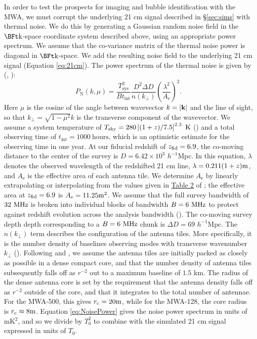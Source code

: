 In order to test the prospects for imaging and bubble identification with
the MWA, we must corrupt the underlying 21 cm signal described in \S \ref{sec:sims}
with thermal noise. We do this by generating a Gaussian random noise field in
the $\k$-space coordinate system described above, using an appropriate power spectrum. We assume that
the co-variance matrix of the thermal noise power is diagonal in $\k$-space. We add
the resulting noise field to the underlying 21 cm signal (Equation \ref{eq:21cm}).
The power spectrum of the thermal noise is given by (\citealt{McQuinn:2005hk}, \citealt{Furlanetto:2006pg}):
\begin{equation}
P_{\text{N}}(k,\mu) =
\frac{T_{\text{sys}}^2}{Bt_{\text{int}}}\frac{D^2\Delta
  D}{n(k_\perp)}\left( \frac{\lambda^2}{A_{\text{e}}}
\right)^{2}. \label{eq:NoisePower}
\end{equation}
Here $\mu$ is the cosine of the angle between wavevector $k = |{\bf
  k}|$ and the line of sight, so that $k_{\perp} = \sqrt{1-\mu^2} k$ is the transverse component of the wavevector. We 
assume a system temperature of $T_{\text{sky}} = 280
\left[(1+z)/7.5\right]^{2.3}\kelvin$ (\citealt{Wyithe:2007if}) and a total
observing time of $t_{\text{int}} = 1000\ \text{hours}$, which is an optimistic
estimate for the observing time in one year. At our fiducial redshift of $z_{\rm fid} = 6.9$, the co-moving
distance to the
center of the survey is $D = 6.42 \times 10^3$ $h^{-1}$Mpc. In this equation, $\lambda$ denotes
the observed wavelength of the redshifted 21 cm line,
$\lambda = 0.211(1+z) \meter$, and $A_{\text{e}}$ is the effective area of
each antenna tile. We determine $A_{\text{e}}$ by linearly extrapolating
or interpolating from the values given in
\href{http://iopscience.iop.org/0004-637X/661/1/1/fulltext/64283.tb2.html}{Table
  2} of \cite{Bowman:2005hj}; the effective area at $z_{\rm fid} = 6.9$ is
$A_{\text{e}}=11.25 \meter^2$. We assume that the full survey bandwidth of
$32 \MHz$ is broken into individual blocks of bandwidth $B = 6 \MHz$ to protect
against redshift evolution across the analysis bandwidth (\citealt{McQuinn:2005hk}). The co-moving survey depth depth corresponding to a $B= 6 \MHz$ chunk is $\Delta D = 69$ $h^{-1}$Mpc.
The $n(k_\perp)$ term describes the configuration of the antenna tiles. More specifically,
it is the number density of baselines observing modes with transverse wavenumber
$k_{\perp}$ (\citealt{McQuinn:2005hk}). Following \cite{Bowman:2005cr} and \cite{McQuinn:2005hk},
we assume the antenna tiles are initially packed as closely as possible in a
dense compact core, and that the number density of antenna tiles subsequently falls off
as $r^{-2}$ out to a
maximum baseline of $1.5$ km. The radius of the dense antenna core
is set  by the requirement that the antenna density falls off as
$r^{-2}$ outside of the core, and that it integrates to the total
number of antennae. For the MWA-500, this gives $r_{\text{c}}
= 20 \meter$, while for the MWA-128, the core radius is $r_{\text{c}}
\approx 8 \meter$. Equation \ref{eq:NoisePower} gives the noise power spectrum in
units of mK$^2$, and so we divide by $T_0^2$ to combine with the simulated 21 cm signal expressed
in units of $T_0$.

